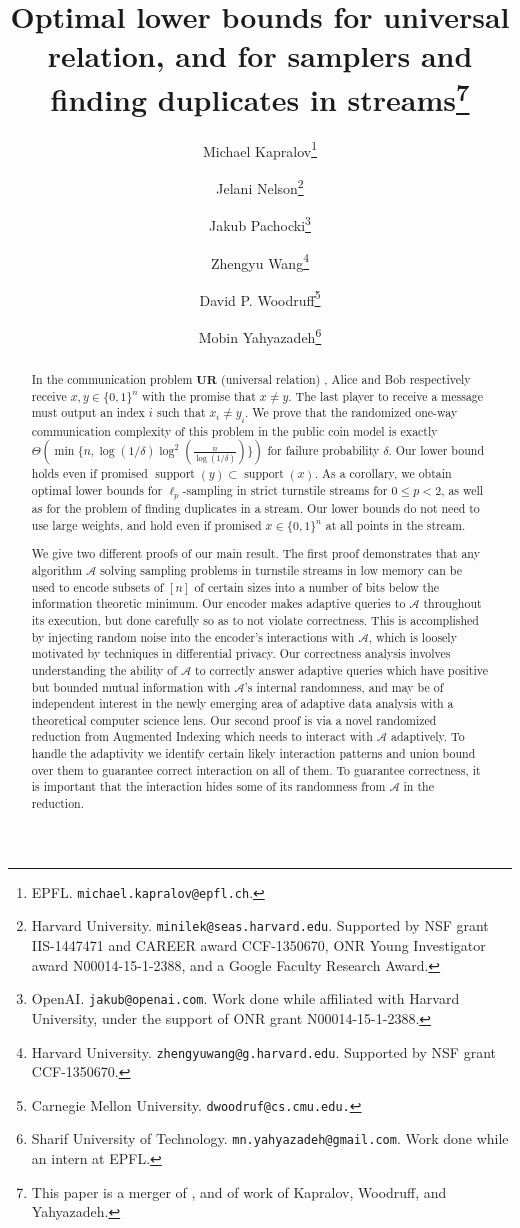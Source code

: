 \documentclass[11pt]{article}
\title{Optimal lower bounds for universal relation, and for samplers and finding duplicates in streams\footnote{This paper is a merger of \cite{NelsonPW17},
    and of work of Kapralov, Woodruff, and Yahyazadeh.}}
\author{
  Michael Kapralov\thanks{EPFL. \texttt{michael.kapralov@epfl.ch}.}
  \and Jelani Nelson\thanks{Harvard University. \texttt{minilek@seas.harvard.edu}. Supported by NSF grant IIS-1447471 and
   CAREER award CCF-1350670, ONR Young Investigator award N00014-15-1-2388, and a Google Faculty Research Award.}
  \and Jakub Pachocki\thanks{OpenAI. \texttt{jakub@openai.com}. Work done while affiliated with Harvard University, under the support of ONR grant N00014-15-1-2388.}
  \and Zhengyu Wang\thanks{Harvard University. \texttt{zhengyuwang@g.harvard.edu}. Supported by NSF grant CCF-1350670.}
  \and David P. Woodruff\thanks{Carnegie Mellon University. \texttt{dwoodruf@cs.cmu.edu.}}
  \and Mobin Yahyazadeh\thanks{Sharif University of Technology. \texttt{mn.yahyazadeh@gmail.com}. Work done while an intern at EPFL.}}
\newcommand{\ur}{\mathbf{UR}\xspace}
\begin{document}
\setcounter{page}{0}

\maketitle

\thispagestyle{empty}

\begin{abstract}
In the communication problem $\ur$ (universal relation) \cite{KarchmerRW95}, Alice and Bob respectively receive $x, y \in\{0,1\}^n$ with the promise that $x\neq y$. The last player to receive a message must output an index $i$ such that $x_i\neq y_i$. We prove that the randomized one-way communication complexity of this problem in the public coin model is exactly $\Theta(\min\{n,\log(1/\delta)\log^2(\frac n{\log(1/\delta)})\})$ for failure probability $\delta$. Our lower bound holds even if promised $\mathop{support}(y)\subset \mathop{support}(x)$. As a corollary, we obtain optimal lower bounds for $\ell_p$-sampling in strict turnstile streams for $0\le p < 2$, as well as for the problem of finding duplicates in a stream. Our lower bounds do not need to use large weights, and hold even if promised $x\in\{0,1\}^n$ at all points in the stream. 

We give two different proofs of our main result. The first proof demonstrates that any algorithm $\mathcal A$ solving sampling problems in turnstile streams in low memory can be used to encode subsets of $[n]$ of certain sizes into a number of bits below the information theoretic minimum. Our encoder makes adaptive queries to $\mathcal A$ throughout its execution, but done carefully so as to not violate correctness. This is accomplished by injecting random noise into the encoder's interactions with $\mathcal A$, which is loosely motivated by techniques in differential privacy. Our correctness analysis involves understanding the ability of $\mathcal A$ to correctly answer adaptive queries which have positive but bounded mutual information with $\mathcal A$'s internal randomness, and may be of independent interest in the newly emerging area of adaptive data analysis with a theoretical computer science lens. Our second proof is via a novel randomized reduction from Augmented Indexing \cite{MiltersenNSW98} which needs to interact with $\mathcal A$ adaptively. To handle the adaptivity we identify certain likely interaction patterns and union bound over them to guarantee correct interaction on all of them. To guarantee correctness, it is important that the interaction hides some of its randomness from $\mathcal A$ in the reduction.
\end{abstract}
\end{document}
